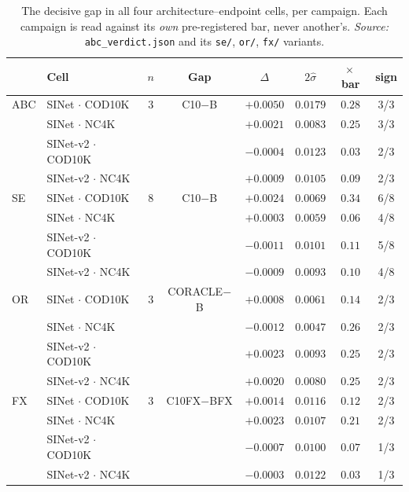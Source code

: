 \documentclass{article}
\begin{document}
\begin{table}[h]
\caption{The decisive gap in all four architecture--endpoint cells, per campaign. Each campaign is
read against its \emph{own} pre-registered bar, never another's. \emph{Source:}
\texttt{abc\_verdict.json} and its \texttt{se/}, \texttt{or/}, \texttt{fx/} variants.}
\label{tab:allcells}
\begin{center}
\small
\begin{tabular}{@{}llcccccc@{}}
\toprule
& Cell & $n$ & Gap & $\Delta$ & $2\hat{\sigma}$ & $\times$\,bar & sign \\
\midrule
ABC & SINet $\cdot$ COD10K & 3 & C10$-$B & $+0.0050$ & $0.0179$ & $0.28$ & 3/3 \\
 & SINet $\cdot$ NC4K &  &  & $+0.0021$ & $0.0083$ & $0.25$ & 3/3 \\
 & SINet-v2 $\cdot$ COD10K &  &  & $-0.0004$ & $0.0123$ & $0.03$ & 2/3 \\
 & SINet-v2 $\cdot$ NC4K &  &  & $+0.0009$ & $0.0105$ & $0.09$ & 2/3 \\
\midrule
SE & SINet $\cdot$ COD10K & 8 & C10$-$B & $+0.0024$ & $0.0069$ & $0.34$ & 6/8 \\
 & SINet $\cdot$ NC4K &  &  & $+0.0003$ & $0.0059$ & $0.06$ & 4/8 \\
 & SINet-v2 $\cdot$ COD10K &  &  & $-0.0011$ & $0.0101$ & $0.11$ & 5/8 \\
 & SINet-v2 $\cdot$ NC4K &  &  & $-0.0009$ & $0.0093$ & $0.10$ & 4/8 \\
\midrule
OR & SINet $\cdot$ COD10K & 3 & CORACLE$-$B & $+0.0008$ & $0.0061$ & $0.14$ & 2/3 \\
 & SINet $\cdot$ NC4K &  &  & $-0.0012$ & $0.0047$ & $0.26$ & 2/3 \\
 & SINet-v2 $\cdot$ COD10K &  &  & $+0.0023$ & $0.0093$ & $0.25$ & 2/3 \\
 & SINet-v2 $\cdot$ NC4K &  &  & $+0.0020$ & $0.0080$ & $0.25$ & 2/3 \\
\midrule
FX & SINet $\cdot$ COD10K & 3 & C10FX$-$BFX & $+0.0014$ & $0.0116$ & $0.12$ & 2/3 \\
 & SINet $\cdot$ NC4K &  &  & $+0.0023$ & $0.0107$ & $0.21$ & 2/3 \\
 & SINet-v2 $\cdot$ COD10K &  &  & $-0.0007$ & $0.0100$ & $0.07$ & 1/3 \\
 & SINet-v2 $\cdot$ NC4K &  &  & $-0.0003$ & $0.0122$ & $0.03$ & 1/3 \\
\bottomrule
\end{tabular}
\end{center}
\end{table}
\end{document}

